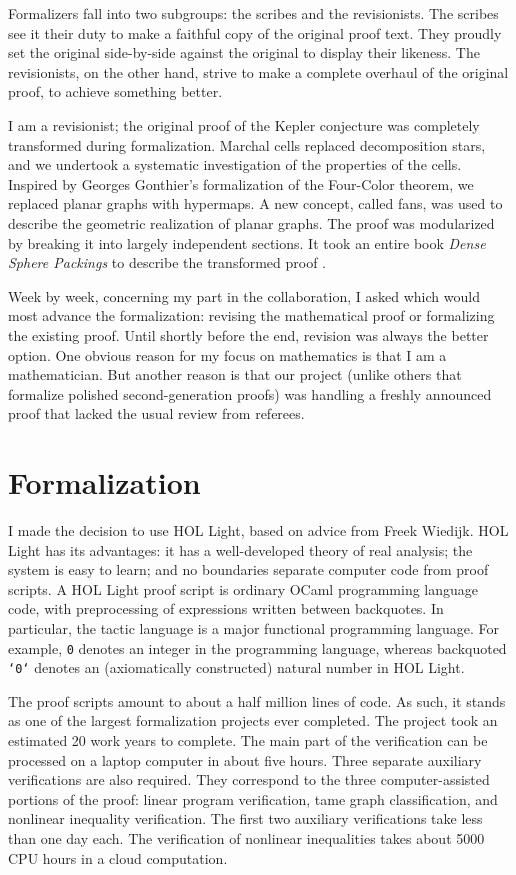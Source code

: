 \documentclass{amsart}
\begin{document}
Formalizers fall into two subgroups: the scribes and the revisionists.
The scribes see it their duty to make a faithful copy of the original
proof text.  They proudly set the original side-by-side against the
original to display their likeness. The revisionists, on the other
hand, strive to make a complete overhaul of the original proof, to
achieve something better.

I am a revisionist; the original proof of the Kepler conjecture was
completely transformed during formalization. Marchal cells replaced
decomposition stars, and we undertook a systematic investigation of
the properties of the cells.  Inspired by Georges Gonthier's
formalization of the Four-Color theorem, we replaced planar graphs
with hypermaps.  A new concept, called fans, was used to describe the
geometric realization of planar graphs.  The proof was modularized by
breaking it into largely independent sections.  It took an entire book
\emph{Dense Sphere Packings} to describe the transformed proof
\cite{DSP}.

Week by week, concerning my part in the collaboration, I asked which
would most advance the formalization: revising the mathematical proof
or formalizing the existing proof.  Until shortly before the end,
revision was always the better option.  One obvious reason for my
focus on mathematics is that I am a mathematician.  But another reason
is that our project (unlike others that formalize polished
second-generation proofs) was handling a freshly announced proof that
lacked the usual review from referees.

\section{Formalization}


I made the decision to use HOL Light, based on advice from Freek
Wiedijk.  HOL Light has its advantages: it has a well-developed theory
of real analysis; the system is easy to learn; and no boundaries
separate computer code from proof scripts.  A HOL Light proof script
is ordinary OCaml programming language code, with preprocessing of
expressions written between backquotes.  In particular, the tactic
language is a major functional programming language.  For example,
{\tt 0} denotes an integer in the programming language, whereas backquoted
{\tt `0`} denotes an (axiomatically constructed) natural number in HOL
Light.


The proof scripts amount to about a half million lines of code.  As
such, it stands as one of the largest formalization projects ever
completed.  The project took an estimated 20 work years to complete.
The main part of the verification can be processed on a laptop
computer in about five hours.  Three separate auxiliary verifications
are also required. They correspond to the three computer-assisted
portions of the proof: linear program verification, tame graph
classification, and nonlinear inequality verification.  The first two
auxiliary verifications take less than one day each.  The verification
of nonlinear inequalities takes about 5000 CPU hours in a cloud
computation.
\end{document}
